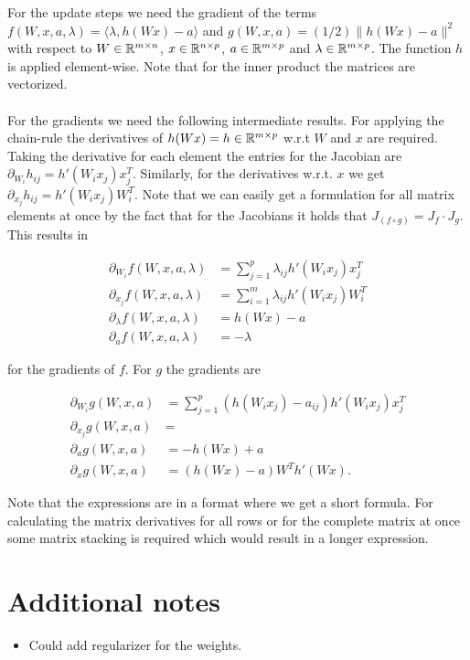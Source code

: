 \documentclass[english,11pt,a4paper]{article}
\newcommand\inner[2]{\langle #1, #2 \rangle}
\begin{document}
For the update steps we need the gradient of the terms $f(W,x,a,\lambda) = \inner{\lambda}{h(Wx)-a}$ and $g(W,x,a) = (1/2) \| h(Wx) - a \|^2$ with respect to $W \in \mathbb{R}^{m \times n}$, $x \in \mathbb{R}^{n \times p}$, $a \in \mathbb{R}^{m \times p}$ and $\lambda \in \mathbb{R}^{m \times p}$. The function $h$ is applied element-wise. Note that for the inner product the matrices are vectorized. \\ \\
For the gradients we need the following intermediate results. For applying the chain-rule the derivatives of $h(Wx) = h \in \mathbb{R}^{m \times p}$ w.r.t $W$ and $x$ are required. Taking the derivative for each element the entries for the Jacobian are $\partial_{W_i}h_{ij} = h'(W_i x_j) x_j^T$. Similarly, for the derivatives w.r.t. $x$ we get $\partial_{x_j}h_{ij} = h'(W_i x_j) W_i^T $. Note that we can easily get a formulation for all matrix elements at once by the fact that for the Jacobians it holds that $J_{(f \circ g)} = J_f \cdot J_g$. This results in

\begin{equation}
	\begin{aligned}
		\partial_{W_i} f(W,x,a,\lambda) &= \sum_{j=1}^{p} \lambda_{ij} h'(W_i x_j) x_j^T \\
		\partial_{x_j} f(W,x,a,\lambda) &= \sum_{i=1}^{m} \lambda_{ij} h'(W_i x_j) W_i^T \\
		\partial_{\lambda} f(W,x,a,\lambda) &= h(W x) - a \\
		\partial_{a} f(W,x,a,\lambda) &= -\lambda
	\end{aligned}
\end{equation}

for the gradients of $f$. For $g$ the gradients are

\begin{equation}
	\begin{aligned}
		\partial_{W_i} g(W,x,a) &= \sum_{j=1}^{p} (h(W_i x_j) - a_{ij}) h'(W_i x_j) x_j^T \\
		\partial_{x_j} g(W,x,a) &=  \\
		
		\partial_{a} g(W,x,a) &= -h(Wx) + a \\
		\partial_{x} g(W,x,a) &= (h(Wx)-a) W^Th'(Wx).
	\end{aligned}
\end{equation}

Note that the expressions are in a format where we get a short formula. For calculating the matrix derivatives for all rows or for the complete matrix at once some matrix stacking is required which would result in a longer expression.

\section{Additional notes}

\begin{itemize}
	\item Could add regularizer for the weights.
\end{itemize}

{\small
  
  
}
\end{document}
